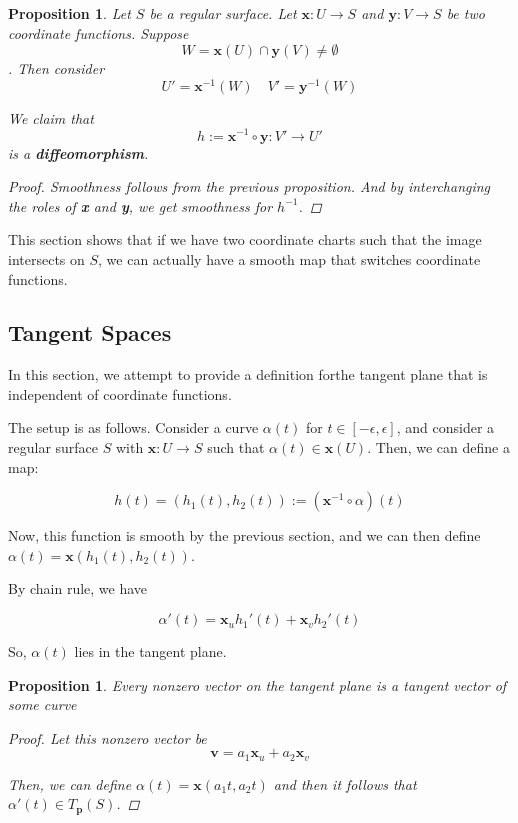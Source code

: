 \documentclass[10pt, a4paper]{article}
\theoremstyle{plain}
\newtheorem{proposition}[theorem]{Proposition}
\theoremstyle{definition}
\theoremstyle{remark}
\newenvironment{sidenote}{%
  \par\vspace{0.5em}%
  \noindent\color{defcolor}%
}{%
  \par\vspace{0.5em}%
  \color{black}%
}
\begin{document}
\begin{proposition}
    Let $S$ be a regular surface. Let $\textbf{x}: U \to S$ and $\textbf{y}:V \to S$ be two coordinate functions. Suppose $$W = \textbf{x}(U) \cap \textbf{y}(V) \neq \emptyset$$. Then consider  $$U' = \textbf{x}^{-1}(W) \quad V' = \textbf{y}^{-1}(W)$$

    We claim that $$h:= \textbf{x}^{-1}\circ \textbf{y}: V' \to U'$$ is a \textbf{diffeomorphism}.

    \begin{proof}
        Smoothness follows from the previous proposition. And by interchanging the roles of \textbf{x} and \textbf{y}, we get smoothness for $h^{-1}$.
    \end{proof}
\end{proposition}


\begin{sidenote}
    This section shows that if we have two coordinate charts such that the image intersects on $S$, we can actually have a smooth map that switches coordinate functions.
\end{sidenote}

\pagebreak


\pagebreak
\subsection{Tangent Spaces}

In this section, we attempt to provide a definition forthe tangent plane that is independent of coordinate functions.

The setup is as follows. Consider a curve $\alpha(t)$ for $t \in [-\epsilon, \epsilon]$, and consider a regular surface $S$ with $\textbf{x}:U \to S$ such that $\alpha(t) \in \textbf{x}(U)$. Then, we can define a map:

$$h(t) = (h_1(t),h_2(t)) := (\textbf{x}^{-1} \circ \alpha)(t)$$

Now, this function is smooth by the previous section, and we can then define $\alpha(t) = \textbf{x}(h_1(t), h_2(t))$.

By chain rule, we have

$$\alpha'(t) = \textbf{x}_u h_1'(t) + \textbf{x}_v h_2'(t)$$

So, $\alpha(t)$ lies in the tangent plane.

\begin{proposition}
    Every nonzero vector on the tangent plane is a tangent vector of some curve

    \begin{proof}
        Let this nonzero vector be $$\textbf{v} = a_1 \textbf{x}_u + a_2 \textbf{x}_v$$

        Then, we can define $\alpha(t) = \textbf{x}(a_1t,a_2t)$ and then it follows that $\alpha'(t) \in T_\textbf{p}(S)$.
    \end{proof}
\end{proposition}
\end{document}
